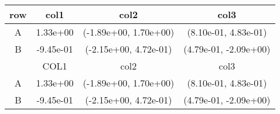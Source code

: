 \begin{tabular}{cccc}
\toprule
row&col1&col2&col3\tabularnewline
\midrule
A&1.33e+00& (-1.89e+00, 1.70e+00)& (8.10e-01, 4.83e-01)\tabularnewline
B&-9.45e-01& (-2.15e+00, 4.72e-01)& (4.79e-01, -2.09e+00)\tabularnewline
\midrule
&COL1&col2&col3\tabularnewline
\midrule
A&1.33e+00& (-1.89e+00, 1.70e+00)& (8.10e-01, 4.83e-01)\tabularnewline
B&-9.45e-01& (-2.15e+00, 4.72e-01)& (4.79e-01, -2.09e+00)\tabularnewline
\bottomrule
\end{tabular}
